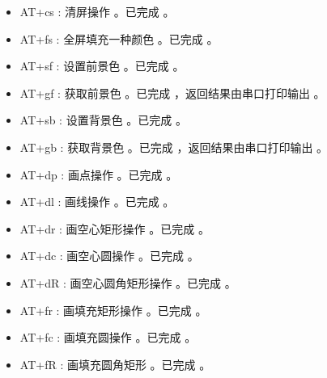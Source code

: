 \documentclass{article}
\begin{document}
\begin{itemize}
\item AT+cs : 清屏操作 。已完成 。
\end{itemize}
\begin{itemize}
\item AT+fs : 全屏填充一种颜色 。已完成 。
\end{itemize}
\begin{itemize}
\item AT+sf : 设置前景色 。已完成 。
\end{itemize}
\begin{itemize}
\item AT+gf : 获取前景色 。已完成 ，返回结果由串口打印输出 。
\end{itemize}
\begin{itemize}
\item AT+sb : 设置背景色 。已完成 。
\end{itemize}
\begin{itemize}
\item AT+gb : 获取背景色 。已完成 ，返回结果由串口打印输出 。
\end{itemize}
\begin{itemize}
\item AT+dp : 画点操作 。已完成 。
\end{itemize}
\begin{itemize}
\item AT+dl : 画线操作 。已完成 。
\end{itemize}
\begin{itemize}
\item AT+dr : 画空心矩形操作 。已完成 。
\end{itemize}
\begin{itemize}
\item AT+dc : 画空心圆操作 。已完成 。
\end{itemize}
\begin{itemize}
\item AT+dR : 画空心圆角矩形操作 。已完成 。
\end{itemize}
\begin{itemize}
\item AT+fr : 画填充矩形操作 。已完成 。
\end{itemize}
\begin{itemize}
\item AT+fc : 画填充圆操作 。已完成 。
\end{itemize}
\begin{itemize}
\item AT+fR : 画填充圆角矩形 。已完成 。
\end{itemize}
\end{document}
